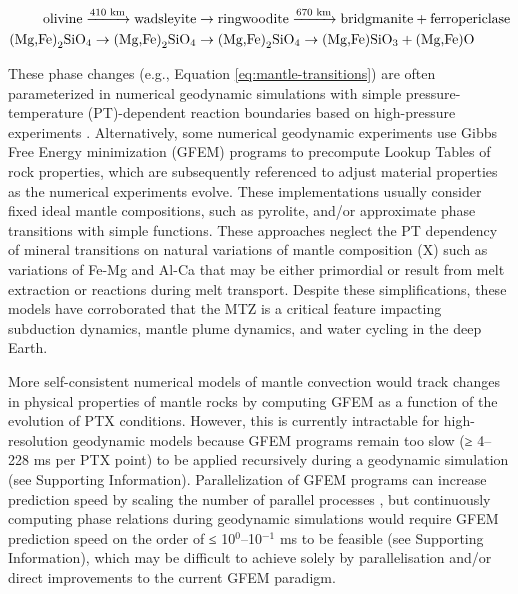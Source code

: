 \documentclass[draft,linenumbers]{agujournal2018}
\begin{document}
\begin{align}
    \text{olivine} \xrightarrow{\text{410 km}} \text{wadsleyite} &\rightarrow \text{ringwoodite} \xrightarrow{\text{670 km}} \text{bridgmanite} + \text{ferropericlase} \notag \\
    \text{(Mg,Fe)}_{2}\text{SiO}_{4} \rightarrow \text{(Mg,Fe)}_{2}\text{SiO}_{4} &\rightarrow \text{(Mg,Fe)}_{2}\text{SiO}_{4} \rightarrow \text{(Mg,Fe)}\text{SiO}_{3} + \text{(Mg,Fe)}\text{O}
    \label{eq:mantle-transitions}
\end{align}

These phase changes (e.g., Equation \eqref{eq:mantle-transitions}) are often parameterized in numerical geodynamic simulations with simple pressure-temperature (PT)-dependent reaction boundaries based on high-pressure experiments \citep[e.g.,][]{agrusta2017, ballmer2015, christensen1995, civzkova2013, kerswell2021, liu1991, nakagawa2005, tackley1994, torii2007}. Alternatively, some numerical geodynamic experiments \citep[e.g.,][]{li2019, yang2020} use Gibbs Free Energy minimization (GFEM) programs \citep[e.g.,][]{connolly2009, riel2022} to precompute Lookup Tables of rock properties, which are subsequently referenced to adjust material properties as the numerical experiments evolve. These implementations usually consider fixed ideal mantle compositions, such as pyrolite, and/or approximate phase transitions with simple functions. These approaches neglect the PT dependency of mineral transitions on natural variations of mantle composition (X) such as variations of Fe-Mg and Al-Ca that may be either primordial or result from melt extraction or reactions during melt transport. Despite these simplifications, these models have corroborated that the MTZ is a critical feature impacting subduction dynamics, mantle plume dynamics, and water cycling in the deep Earth.

More self-consistent numerical models of mantle convection would track changes in physical properties of mantle rocks by computing GFEM as a function of the evolution of PTX conditions. However, this is currently intractable for high-resolution geodynamic models because GFEM programs remain too slow (≥ 4--228 ms per PTX point) to be applied recursively during a geodynamic simulation (see Supporting Information). Parallelization of GFEM programs can increase prediction speed by scaling the number of parallel processes \citep{riel2022}, but continuously computing phase relations during geodynamic simulations would require GFEM prediction speed on the order of ≤ 10\(^0\)--10\(^{-1}\) ms to be feasible (see Supporting Information), which may be difficult to achieve solely by parallelisation and/or direct improvements to the current GFEM paradigm.
\end{document}
